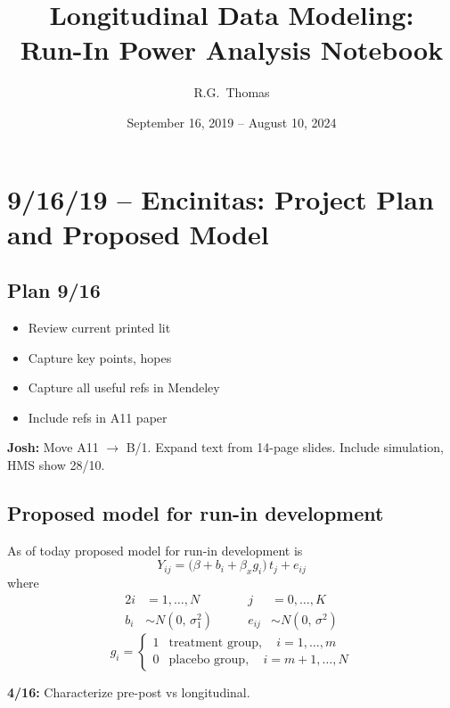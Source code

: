 \documentclass[11pt]{article}
\title{Longitudinal Data Modeling: \\
  Run-In Power Analysis Notebook}
\author{R.G.\ Thomas}
\date{September 16, 2019 -- August 10, 2024}
\newcommand{\marginmark}[1]{%
  \begin{mdframed}[linewidth=0.5pt,innertopmargin=4pt,
    innerbottommargin=4pt]
  \small #1
  \end{mdframed}}
\begin{document}
\maketitle
\tableofcontents
\newpage

\section{9/16/19 -- Encinitas: Project Plan and Proposed Model}

\subsection*{Plan 9/16}

\begin{itemize}
  \item Review current printed lit
  \item Capture key points, hopes
  \item Capture all useful refs in Mendeley
  \item Include refs in A11 paper
\end{itemize}

\marginmark{%
  \textbf{Josh:} Move A11 $\to$ B/1. Expand text from
  14-page slides. Include simulation, HMS show 28/10.}

\subsection*{Proposed model for run-in development}

As of today proposed model for run-in development is
\begin{equation}
  Y_{ij} = \bigl(\beta + b_i + \beta_x g_i\bigr)\, t_j
    + e_{ij}
\end{equation}
where
\begin{alignat*}{2}
  i &= 1, \ldots, N &\qquad
  j &= 0, \ldots, K \\[4pt]
  b_i &\sim N(0,\, \sigma_1^2) &\qquad
  e_{ij} &\sim N(0,\, \sigma^2)
\end{alignat*}
\[
  g_i =
  \begin{cases}
    1 & \text{treatment group}, \quad i = 1,\ldots,m \\
    0 & \text{placebo group}, \quad i = m+1,\ldots,N
  \end{cases}
\]

\marginmark{%
  \textbf{4/16:} Characterize pre-post vs longitudinal.}
\end{document}
